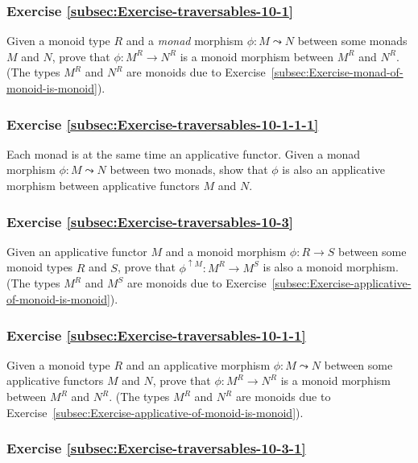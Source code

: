 \subsubsection{Exercise \label{subsec:Exercise-traversables-10-1}\ref{subsec:Exercise-traversables-10-1}}

Given a monoid type $R$ and a \emph{monad} morphism $\phi:M\leadsto N$
between some monads $M$ and $N$, prove that $\phi:M^{R}\rightarrow N^{R}$
is a monoid morphism between $M^{R}$ and $N^{R}$. (The types $M^{R}$
and $N^{R}$ are monoids due to Exercise~\ref{subsec:Exercise-monad-of-monoid-is-monoid}).

\subsubsection{Exercise \label{subsec:Exercise-traversables-10-1-1-1}\ref{subsec:Exercise-traversables-10-1-1-1}}

Each monad is at the same time an applicative functor. Given a monad
morphism $\phi:M\leadsto N$ between two monads, show that $\phi$
is also an applicative morphism between applicative functors $M$
and $N$.

\subsubsection{Exercise \label{subsec:Exercise-traversables-10-3}\ref{subsec:Exercise-traversables-10-3}}

Given an applicative functor $M$ and a monoid morphism $\phi:R\rightarrow S$
between some monoid types $R$ and $S$, prove that $\phi^{\uparrow M}:M^{R}\rightarrow M^{S}$
is also a monoid morphism. (The types $M^{R}$ and $M^{S}$ are monoids
due to Exercise~\ref{subsec:Exercise-applicative-of-monoid-is-monoid}).

\subsubsection{Exercise \label{subsec:Exercise-traversables-10-1-1}\ref{subsec:Exercise-traversables-10-1-1}}

Given a monoid type $R$ and an applicative morphism $\phi:M\leadsto N$
between some applicative functors $M$ and $N$, prove that $\phi:M^{R}\rightarrow N^{R}$
is a monoid morphism between $M^{R}$ and $N^{R}$. (The types $M^{R}$
and $N^{R}$ are monoids due to Exercise~\ref{subsec:Exercise-applicative-of-monoid-is-monoid}).

\subsubsection{Exercise \label{subsec:Exercise-traversables-10-3-1}\ref{subsec:Exercise-traversables-10-3-1}}

